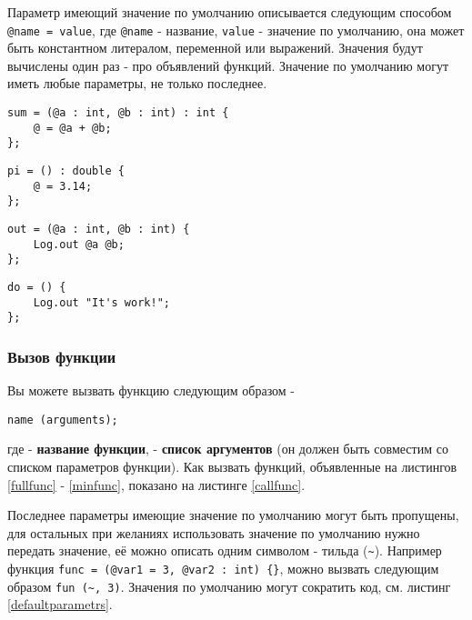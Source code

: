 Параметр имеющий значение по умолчанию описывается следующим способом \lstinline|@name = value|, где \lstinline|@name| - название, \lstinline|value| - значение по умолчанию, она может быть константном литералом, переменной или выражений. Значения будут вычислены один раз - про объявлений функций. Значение по умолчанию могут иметь любые параметры, не только последнее.

\begin{lstlisting}[caption=Полноценная функция, label=fullfunc]
sum = (@a : int, @b : int) : int {
	@ = @a + @b;
};
\end{lstlisting}

\begin{lstlisting}[caption=Функция без аргументов, label=noargsfunc]
pi = () : double {
	@ = 3.14;
};
\end{lstlisting}

\begin{lstlisting}[caption=Функция без типа возвращаемой значений, label=notypefunc]
out = (@a : int, @b : int) {
	Log.out @a @b;
};
\end{lstlisting}

\begin{lstlisting}[caption=Функция без аргументов и тип возвращаемой значений, label=minfunc]
do = () {
	Log.out "It's work!";
};
\end{lstlisting}

\subsubsection{Вызов функции}

Вы можете вызвать функцию следующим образом -
\begin{lstlisting}[numbers=none]
name (arguments);
\end{lstlisting}
где  - {\bf название функции},  - {\bf список аргументов} (он должен быть совместим со списком параметров функции). Как вызвать функций, объявленные на листингов \ref{fullfunc} - \ref{minfunc}, показано на листинге \ref{callfunc}. 

Последнее параметры имеющие значение по умолчанию могут быть пропущены, для остальных при желаниях использовать значение по умолчанию нужно передать \void{} значение, её можно описать одним символом - тильда (\lstinline|~|). Например функция \lstinline|func = (@var1 = 3, @var2 : int) {}|, можно вызвать следующим образом \lstinline|fun (~, 3)|. Значения по умолчанию могут сократить код, см. листинг \ref{defaultparametrs}.

